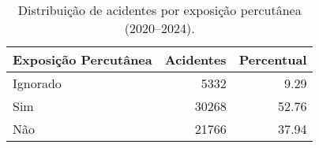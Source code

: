 \begin{table}
\caption{Distribuição de acidentes por exposição percutânea (2020–2024).}
\begin{tabular}{lrr}
\toprule
Exposição Percutânea & Acidentes & Percentual \\
\midrule
Ignorado & 5332 & 9.29 \\
Sim & 30268 & 52.76 \\
Não & 21766 & 37.94 \\
\bottomrule
\end{tabular}
\end{table}
